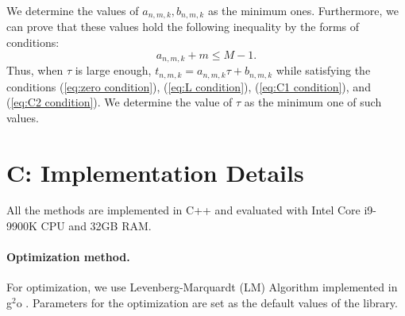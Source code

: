\documentclass[letterpaper]{article} %
\begin{document}
We determine the values of $a_{n,m,k}, b_{n,m,k}$ as the minimum ones.
Furthermore, we can prove that these values hold the following inequality by the forms of conditions:
\begin{equation}
    a_{n,m,k}+m\leq M-1.
\end{equation}
Thus, when $\tau$ is large enough, $t_{n,m,k}=a_{n,m,k}\tau+b_{n,m,k}$ while satisfying the conditions (\ref{eq:zero condition}), (\ref{eq:L condition}), (\ref{eq:C1 condition}), and (\ref{eq:C2 condition}). We determine the value of $\tau$ as the minimum one of such values.

\section{C: Implementation Details}
All the methods are implemented in C++ and evaluated with Intel Core i9-9900K CPU and 32GB RAM.
\paragraph{Optimization method.}
For optimization, we use Levenberg-Marquardt (LM) Algorithm implemented in g$^2$o \cite{kummerle2011g}. Parameters for the optimization are set as the default values of the library.
\end{document}
